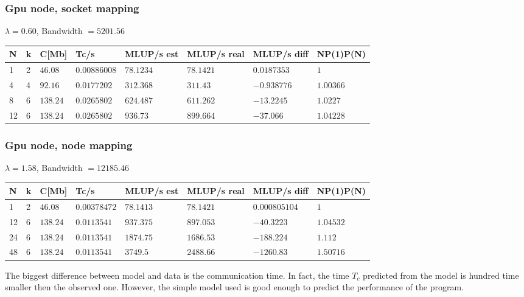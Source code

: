 \documentclass[11pt,a4paper]{report}
\theoremstyle{definition}
\begin{document}
\subsubsection{Gpu node, socket mapping}
$\lambda = 0.60$, Bandwidth $= 5201.56$
\begin{center}
\begin{tabular}{llllllll} %
\toprule
N & k & C[Mb] & Tc/s & MLUP/s est & MLUP/s real & MLUP/s diff &NP(1)P(N) \\
\midrule
1 &2	& $46.08$	& $0.00886008$ 	& $78.1234$ 	& $78.1421$ 	& $0.0187353$ & $1$ \\
4 &4	    & $92.16$	& $0.0177202$	& $312.368$		& $311.43$		& $-0.938776$ & $1.00366$\\
8 &6	& $138.24$	& $0.0265802$ 	& $624.487$		& $611.262$		& $-13.2245$ & $1.0227$\\
12&6	& $138.24$	& $0.0265802$	& $936.73$		& $899.664$		& $-37.066$ & $1.04228$\\
\bottomrule
\end{tabular}
\end{center}
\subsubsection{Gpu node, node mapping} %
$\lambda = 1.58$, Bandwidth $= 12185.46$
\begin{center}
\begin{tabular}{llllllll}
\toprule
N & k & C[Mb] & Tc/s & MLUP/s est & MLUP/s real & MLUP/s diff &NP(1)P(N) \\
\midrule
1 &2	& $46.08$	& $0.00378472$ 	& $78.1413$ 	& $78.1421$ 	& $0.000805104$ & $1$ \\
12&6	& $138.24$	& $0.0113541$	& $937.375$		& $897.053$		& $-40.3223$ & $1.04532$\\
24&6	& $138.24$	& $0.0113541$ 	& $1874.75$		& $1686.53$		& $-188.224$ & $1.112$\\
48&6	& $138.24$	& $0.0113541$	& $3749.5$		& $2488.66$		& $-1260.83$ & $1.50716$\\
\bottomrule
\end{tabular}
\end{center}
The biggest difference between model and data is the communication time. In fact, the time $T_c$ predicted from the model is hundred time smaller then the observed one. However, the simple model used is good enough to predict the performance of the program.
\end{document}
